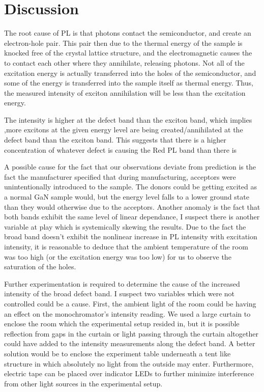 \section{Discussion}
	The root cause of PL is that photons contact the semiconductor, and create an electron-hole pair. This pair then due to the thermal energy of the sample is knocked free of the crystal lattice structure, and the electromagnetic causes the to contact each other where they annihilate, releasing photons. Not all of the excitation energy is actually transferred into the holes of the semiconductor, and some of the energy is transferred into the sample itself as thermal energy. Thus, the measured intensity of exciton annihilation will be less than the excitation energy.

	The intensity is higher at the defect band than the exciton band, which implies ,more excitons at the given energy level are being created/annihilated at the defect band than the exciton band. This suggests that there is a higher concentration of whatever defect is causing the Red PL band than there is 

	A possible cause for the fact that our observations deviate from prediction is the fact the manufacturer specified that during manufacturing, acceptors were unintentionally introduced to the sample. The donors could be getting excited as a normal GaN sample would, but the energy level falls to a lower ground state than they would otherwise due to the acceptors.
Another anomaly is the fact that both bands exhibit the same level of linear dependance, I suspect there is another variable at play which is systemically skewing the results. Due to the fact the broad band doesn’t exhibit the nonlinear increase in PL intensity with excitation intensity, it is reasonable to deduce that the ambient temperature of the room was too high (or the excitation energy was too low) for us to observe the saturation of the holes.

	Further experimentation is required to determine the cause of the increased intensity of the broad defect band. I suspect two variables which were not controlled could be a cause. First, the ambient light of the room could be having an effect on the monochromator’s intensity reading. We used a large curtain to enclose the room which the experimental setup resided in, but it is possible reflection from gaps in the curtain or light passing through the curtain altogether could have added to the intensity measurements along the defect band.
A better solution would be to enclose the experiment table underneath a tent like structure in which absolutely no light from the outside may enter. Furthermore, electric tape can be placed over indicator LEDs to further minimize interference from other light sources in the experimental setup.

